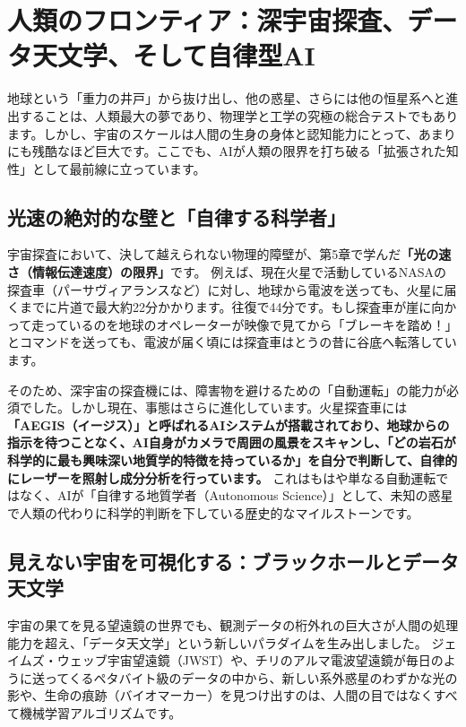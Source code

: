 \section{人類のフロンティア：深宇宙探査、データ天文学、そして自律型AI}

地球という「重力の井戸」から抜け出し、他の惑星、さらには他の恒星系へと進出することは、人類最大の夢であり、物理学と工学の究極の総合テストでもあります。しかし、宇宙のスケールは人間の生身の身体と認知能力にとって、あまりにも残酷なほど巨大です。ここでも、AIが人類の限界を打ち破る「拡張された知性」として最前線に立っています。

\subsection{光速の絶対的な壁と「自律する科学者」}

宇宙探査において、決して越えられない物理的障壁が、第5章で学んだ\textbf{「光の速さ（情報伝達速度）の限界」}です。 例えば、現在火星で活動しているNASAの探査車（パーサヴィアランスなど）に対し、地球から電波を送っても、火星に届くまでに片道で最大約22分かかります。往復で44分です。もし探査車が崖に向かって走っているのを地球のオペレーターが映像で見てから「ブレーキを踏め！」とコマンドを送っても、電波が届く頃には探査車はとうの昔に谷底へ転落しています。

そのため、深宇宙の探査機には、障害物を避けるための「自動運転」の能力が必須でした。しかし現在、事態はさらに進化しています。火星探査車には\textbf{「AEGIS（イージス）」と呼ばれるAIシステムが搭載されており、地球からの指示を待つことなく、AI自身がカメラで周囲の風景をスキャンし、「どの岩石が科学的に最も興味深い地質学的特徴を持っているか」を自分で判断して、自律的にレーザーを照射し成分分析を行っています。} これはもはや単なる自動運転ではなく、AIが「自律する地質学者（Autonomous Science）」として、未知の惑星で人類の代わりに科学的判断を下している歴史的なマイルストーンです。

\subsection{見えない宇宙を可視化する：ブラックホールとデータ天文学}

宇宙の果てを見る望遠鏡の世界でも、観測データの桁外れの巨大さが人間の処理能力を超え、「データ天文学」という新しいパラダイムを生み出しました。 ジェイムズ・ウェッブ宇宙望遠鏡（JWST）や、チリのアルマ電波望遠鏡が毎日のように送ってくるペタバイト級のデータの中から、新しい系外惑星のわずかな光の影や、生命の痕跡（バイオマーカー）を見つけ出すのは、人間の目ではなくすべて機械学習アルゴリズムです。

